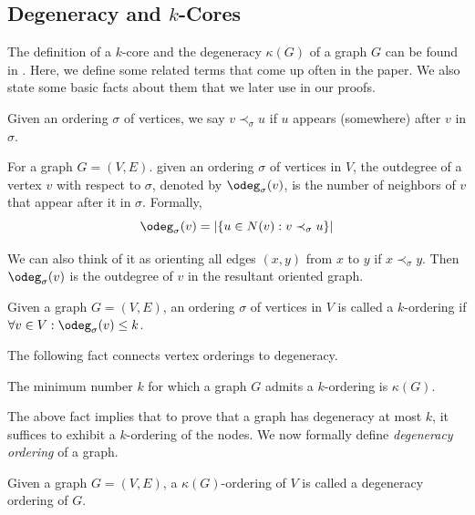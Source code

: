 \subsection{Degeneracy and \texorpdfstring{$k$-Cores}{k-Cores}}

The definition of a $k$-core and the degeneracy $\kappa(G)$ of a graph $G$ can be found in . Here, we define some related terms that come up often in the paper. We also state some basic facts about them that we later use in our proofs. 


Given an ordering $\sigma$ of vertices, we say $v\prec_\sigma u$ if $u$ appears (somewhere) after $v$ in $\sigma$. 

\begin{definition}\label{def:odegordering}
    For a graph $G=(V,E)$. given an ordering $\sigma$ of vertices in $V$, the outdegree of a vertex $v$ with respect to $\sigma$, denoted by $\odeg_{\sigma}(v)$, is the number of neighbors of $v$ that appear after it in $\sigma$. Formally,
$$\odeg_{\sigma}(v) = |\{u\in N(v): v \prec_\sigma u\}|$$ 
\end{definition}

We can also think of it as orienting all edges $(x,y)$ from $x$ to $y$ if $x\prec_\sigma y$. Then $\odeg_\sigma(v)$ is the outdegree of $v$ in the resultant oriented graph. 


\begin{definition}[$k$-ordering]\label{def:k-ordering} 
    Given a graph $G=(V,E)$, an ordering $\sigma$ of vertices in $V$ is called a $k$-ordering if $\forall v\in V: \odeg_\sigma(v)\leq k$.   
\end{definition}

The following fact connects vertex orderings to degeneracy. 

\begin{fact}\label{fact:min-k-ord}
    The minimum number $k$ for which a graph $G$ admits a $k$-ordering is $\kappa(G)$.
\end{fact}


The above fact implies that to prove that a graph has degeneracy at most $k$, it suffices to exhibit a $k$-ordering of the nodes. We now formally define \emph{degeneracy ordering} of a graph.  

\begin{definition} \label{def:degen-ord}
    Given a graph $G=(V,E)$, a $\kappa(G)$-ordering of $V$ is called a degeneracy ordering of $G$.
\end{definition}


